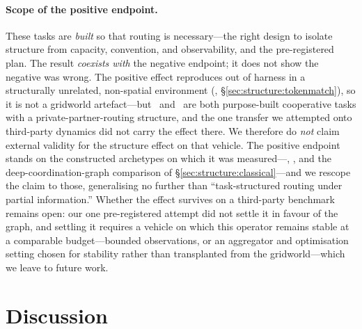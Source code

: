 \paragraph{Scope of the positive endpoint.} These tasks are \emph{built} so
that routing is necessary---the right design to isolate structure from
capacity, convention, and observability, and the pre-registered plan. The
result \emph{coexists with} the negative endpoint; it does not show the
negative was wrong. The positive effect reproduces out of harness in a
structurally unrelated, non-spatial environment (\tokenmatch,
\S\ref{sec:structure:tokenmatch}), so it is not a gridworld artefact---but
\tokenmatch\ and \pairrouting\ are both purpose-built cooperative tasks with a
private-partner-routing structure, and the one transfer we attempted onto
third-party dynamics did not carry the effect there. We therefore do
\emph{not} claim external validity for the structure effect on that vehicle.
The positive endpoint stands on the constructed archetypes on which it was
measured---\pairrouting, \tokenmatch, and the deep-coordination-graph
comparison of \S\ref{sec:structure:classical}---and we rescope the claim to
those, generalising no further than ``task-structured routing under partial
information.'' Whether the effect survives on a third-party benchmark remains
open: our one pre-registered attempt did not settle it in favour of the graph,
and settling it requires a vehicle on which this operator remains stable at a
comparable budget---bounded observations, or an aggregator and optimisation
setting chosen for stability rather than transplanted from the
gridworld---which we leave to future work.

\section{Discussion}
\label{sec:discussion}

